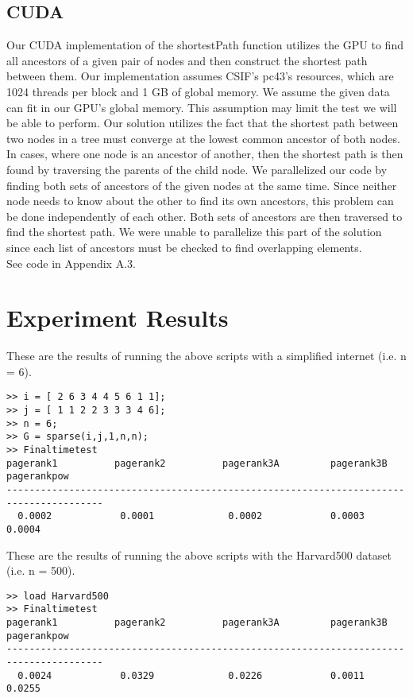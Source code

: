 \documentclass[11pt,letterpaper]{article}
\begin{document}
\subsection{CUDA}
Our CUDA implementation of the shortestPath function utilizes the GPU to find all ancestors of a given pair of nodes and then construct the shortest path between them. 
Our implementation assumes CSIF's pc43's resources, which are 1024 threads per block and 1 GB of global memory. We assume the given data can fit in our GPU’s global memory. 
This assumption may limit the test we will be able to perform. 
Our solution utilizes the fact that the shortest path between two nodes in a tree must converge at the lowest common ancestor of both nodes. 
In cases, where one node is an ancestor of another, then the shortest path is then found by traversing the parents of the child node. 
We parallelized our code by finding both sets of ancestors of the given nodes at the same time. 
Since neither node needs to know about the other to find its own ancestors, this problem can be done independently of each other. 
Both sets of ancestors are then traversed to find the shortest path. 
We were unable to parallelize this part of the solution since each list of ancestors must be checked to find overlapping elements. \\

See code in Appendix A.3.\\

\section{Experiment Results}

These are the results of running the above scripts with a simplified internet (i.e.  n = 6).
\begin{verbatim}
>> i = [ 2 6 3 4 4 5 6 1 1];
>> j = [ 1 1 2 2 3 3 3 4 6];
>> n = 6;
>> G = sparse(i,j,1,n,n);
>> Finaltimetest
pagerank1          pagerank2          pagerank3A         pagerank3B        pagerankpow
---------------------------------------------------------------------------------------
  0.0002            0.0001             0.0002            0.0003            0.0004
\end{verbatim}
These are the results of running the above scripts with the Harvard500 dataset (i.e. n = 500).
\begin{verbatim}
>> load Harvard500
>> Finaltimetest
pagerank1          pagerank2          pagerank3A         pagerank3B        pagerankpow
---------------------------------------------------------------------------------------
  0.0024            0.0329             0.0226            0.0011            0.0255
\end{verbatim}
\end{document}
